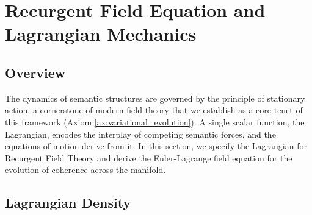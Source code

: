\chapter{Recurgent Field Equation and Lagrangian Mechanics}\label{ch:lagrangian_mechanics}

\section{Overview}

The dynamics of semantic structures are governed by the principle of stationary action, a cornerstone of modern field theory \autocite{GoldsteinPooleSafko2002, Arnold1989} that we establish as a core tenet of this framework (Axiom \ref{ax:variational_evolution}). A single scalar function, the Lagrangian, encodes the interplay of competing semantic forces, and the equations of motion derive from it. In this section, we specify the Lagrangian for Recurgent Field Theory and derive the Euler-Lagrange field equation for the evolution of coherence across the manifold.

\section{Lagrangian Density}

